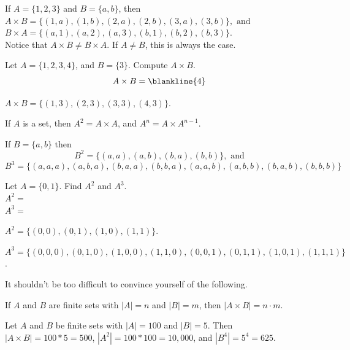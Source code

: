 \begin{exa}
If $A=\{1,2,3\}$ and $B=\{a,b\}$, then\\
$A\times B=\{(1,a), (1,b), (2,a), (2,b), (3,a), (3,b)\},\mbox{ and}$\\
$B\times A=\{(a,1), (a,2), (a,3), (b,1), (b,2), (b,3)\}.$\\
Notice that $A\times B \neq B\times A$.
If $A\neq B$, this is always the case.
\end{exa}

\begin{exer}
Let $A=\{1,2,3,4\}$, and $B=\{3\}$.  Compute $A\times B$.
$$A\times B=\blankline{4}$$
\begin{answer}
$A\times B = \{(1,3), (2,3), (3,3), (4,3)\}$.
\end{answer}
\end{exer}

\begin{df}
If $A$ is a set, then $A^2 = A\times A$, and $A^n = A\times A^{n-1}$.
\end{df}

\begin{exa}
If $B=\{a,b\}$ then 
$$B^2=\{(a,a), (a,b), (b,a), (b,b)\},\mbox{ and}$$
$$B^3=\{(a,a,a), (a,b,a), (b,a,a), (b,b,a), (a,a,b), (a,b,b), (b,a,b), (b,b,b)\}$$
\end{exa}

\begin{exer}
Let $A=\{0,1\}$.  Find $A^2$ and $A^3$.\\[.25in]
$A^2=$\\[.25in]
$A^3=$\\
\begin{answer}
$A^2=\{(0,0), (0,1), (1,0), (1,1)\}$.

\noindent
$A^3=\{(0,0,0), (0,1,0), (1,0,0), (1,1,0), (0,0,1), (0,1,1), (1,0,1), (1,1,1)\}$.
\end{answer}
\end{exer}

It shouldn't be too difficult to convince yourself of the following.
\begin{thm}
If $A$ and $B$ are finite sets with $|A|=n$ and $|B|=m$, then 
$|A\times B|=n\cdot m$.
\end{thm}

\begin{exa}
Let $A$ and $B$ be finite sets with $|A|=100$ and $|B|=5$.
Then $|A\times B| = 100*5=500$, $|A^2|=100*100=10,000$, and $|B^4|=5^4=625$.
\end{exa}

